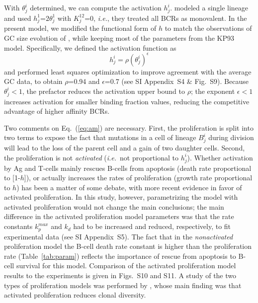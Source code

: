\documentclass[utf8]{frontiersHLTH}%
\def\ie {{\it i.e.}}
\newcommand{\eq}[1] {Eq.~(\ref{eq:#1})}
\newcommand{\figs}[2]{Figs.~\ref{fig:#1} and~\ref{fig:#2}}
\newcommand{\tab}[1]{Table~\ref{tab:#1}}
\newcommand{\SI}{SI Appendix}
\begin{document}
With $\theta_j^i$ determined, we can compute the activation $h^i_j$. \citet{kepler93}
modeled a single lineage and used $h^1_j$=$2\theta^1_j$ with $K^{12}_j$=0, \ie,
they treated all BCRs as monovalent. In the present model, we modified
the functional form of $h$ to match the observations of
GC size evolution of \citet{wittenbrink11}, while keeping most of the
parameters from the KP93 model\cite{kepler93}. Specifically,
we defined the activation function as
\begin{equation}
 h^i_j=\rho(\theta^i_j)^{\epsilon}
 \label{eq:act}
\end{equation}
and performed least squares optimization to improve agreement with the average GC data\cite{wittenbrink11}, to obtain
$\rho$=0.94 and $\epsilon$=0.7 (see \SI~S4 \& Fig.~S9).
Because $\theta^i_j<1$, the prefactor reduces the activation upper bound to $\rho$; the exponent $\epsilon<1$ increases
activation for smaller binding fraction values, reducing the competitive advantage of higher affinity BCRs.

Two comments on \eq{am} are necessary. First, the proliferation is split
into two terms\cite{kepler93} to expose the fact that mutations in a cell
of lineage $B^i_j$ during division will lead to the loss of the parent cell
and a gain of two daughter cells.
Second, the
proliferation is not \textit{activated} (\ie~not proportional to $h^i_j$).
Whether activation by Ag and T-cells mainly rescues B-cells
from apoptosis (death rate proportional to
[1-$h$]),\cite{anderson09,zhang10} or actually increases the rates of
proliferation (growth rate proportional to $h$) has been a
matter of some debate, with more recent evidence in favor of activated
proliferation.\cite{gitlin15} In this study, however, parametrizing the model
with activated proliferation would not change the main conclusions;
the main difference in the activated proliferation model parameters was that the rate constants
$k_p^{max}$ and $k_d$ had to be increased and reduced, respectively, to fit experimental data (see \SI~S5). The fact that
in the \textit{nonactivated} proliferation model the B-cell death rate constant is higher than the proliferation rate (\tab{param})
reflects the importance of rescue from apoptosis to B-cell survival for this model.
Comparison of the activated proliferation model results to the
experiments\cite{wittenbrink11,weisel16} is given in Figs.~S10 and S11. %
A study of the two types of proliferation models was performed by \citet{amitai17},
whose main finding was that activated proliferation reduces clonal
diversity.
\end{document}
